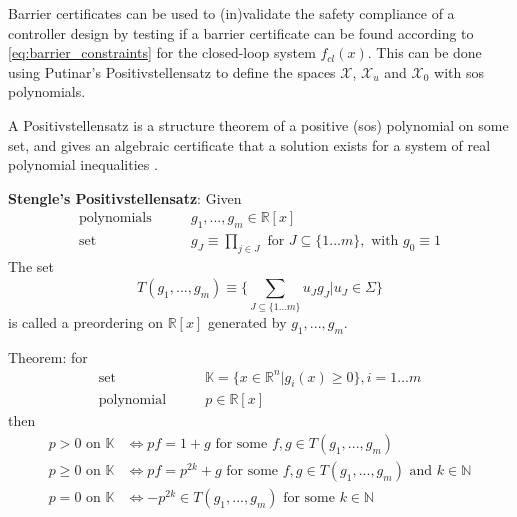 Barrier certificates can be used to (in)validate the safety compliance of a controller design by testing if a barrier certificate can be found according to \autoref{eq:barrier_constraints} for the closed-loop system $f_{cl}(x)$. This can be done using Putinar's Positivstellensatz to define the spaces $\mathcal{X}$, $\mathcal{X}_u$ and $\mathcal{X}_0$ with \gls{sos} polynomials. 

A Positivstellensatz is a structure theorem of a positive (\gls{sos}) polynomial on some set, and gives an algebraic certificate that a solution exists for a system of real polynomial inequalities \citep{bib:positivstellensatz}. 

\textbf{Stengle's Positivstellensatz}: Given 
\begin{align}
\text{polynomials} \qquad & g_1,...,g_m \in \mathbb{R}[x]\\
\text{set} \qquad & g_J\equiv\prod_{j\in J} \text{ for } J\subseteq\{1...m\}, \text{ with } g_0\equiv 1
\end{align}
The set 
\begin{equation}
T(g_1,...,g_m)\equiv\{\sum\limits_{J\subseteq \{1...m\}}^{}u_Jg_J | u_J\in\Sigma\}
\end{equation} 
is called a preordering on $\mathbb{R}[x]$ generated by $g_1,...,g_m$. 

Theorem: for
\begin{align}
\text{set}	 \qquad & \mathbb{K}=\{x\in \mathbb{R}^n | g_i(x)\geq0\}, i=1...m\\
\text{polynomial} \qquad & p\in\mathbb{R}[x]
\end{align}
then
\begin{align}
p>0 \text{ on } \mathbb{K} & \Leftrightarrow pf=1+g \text{ for some } f,g\in T(g_1,...,g_m)\\
p\geq 0 \text{ on } \mathbb{K} & \Leftrightarrow  pf=p^{2k}+g \text{ for some } f,g\in T(g_1,...,g_m) \text{ and } k\in \mathbb{N}\\
p=0 \text{ on } \mathbb{K} & \Leftrightarrow -p^{2k}\in T(g_1,...,g_m) \text{ for some }  k\in \mathbb{N}
\end{align}
\citep{bib:sos_putinar_laurent}

